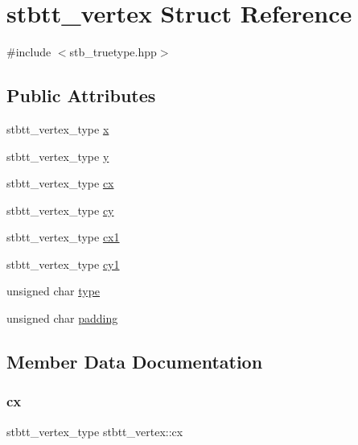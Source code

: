 \hypertarget{structstbtt__vertex}{}\section{stbtt\+\_\+vertex Struct Reference}
\label{structstbtt__vertex}


{\ttfamily \#include $<$stb\+\_\+truetype.\+hpp$>$}

\subsection*{Public Attributes}
\begin{DoxyCompactItemize}
\item 
stbtt\+\_\+vertex\+\_\+type \hyperlink{structstbtt__vertex_a81773edbe760d0e090561a3c1e86c919}{x}
\item 
stbtt\+\_\+vertex\+\_\+type \hyperlink{structstbtt__vertex_a9052065ca544b63d537325b246928cfc}{y}
\item 
stbtt\+\_\+vertex\+\_\+type \hyperlink{structstbtt__vertex_a43835489e2a151b31cb100d20f8adeae}{cx}
\item 
stbtt\+\_\+vertex\+\_\+type \hyperlink{structstbtt__vertex_a5610d6335aa6962d970fc7fd2225545e}{cy}
\item 
stbtt\+\_\+vertex\+\_\+type \hyperlink{structstbtt__vertex_a1c45a8d41727b24b84f97a944f2b800a}{cx1}
\item 
stbtt\+\_\+vertex\+\_\+type \hyperlink{structstbtt__vertex_a68227d28643f5667064fa3c385f4ea7d}{cy1}
\item 
unsigned char \hyperlink{structstbtt__vertex_aa325b3707b88e7e104c0de46bb2bf395}{type}
\item 
unsigned char \hyperlink{structstbtt__vertex_a8bd328747e8ea018612960a52e3e3ede}{padding}
\end{DoxyCompactItemize}


\subsection{Member Data Documentation}
\hypertarget{structstbtt__vertex_a43835489e2a151b31cb100d20f8adeae}{}\label{structstbtt__vertex_a43835489e2a151b31cb100d20f8adeae} 
\subsubsection{\texorpdfstring{cx}{cx}}
{\footnotesize\ttfamily stbtt\+\_\+vertex\+\_\+type stbtt\+\_\+vertex\+::cx}

